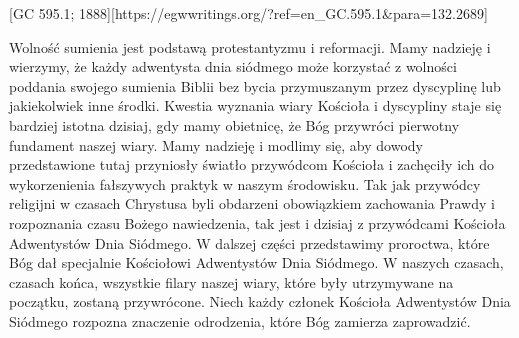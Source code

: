 [GC 595.1; 1888][https://egwwritings.org/?ref=en\_GC.595.1&para=132.2689]

Wolność sumienia jest podstawą protestantyzmu i reformacji. Mamy nadzieję i wierzymy, że każdy adwentysta dnia siódmego może korzystać z wolności poddania swojego sumienia Biblii bez bycia przymuszanym przez dyscyplinę lub jakiekolwiek inne środki. Kwestia wyznania wiary Kościoła i dyscypliny staje się bardziej istotna dzisiaj, gdy mamy obietnicę, że Bóg przywróci pierwotny fundament naszej wiary. Mamy nadzieję i modlimy się, aby dowody przedstawione tutaj przyniosły światło przywódcom Kościoła i zachęciły ich do wykorzenienia fałszywych praktyk w naszym środowisku. Tak jak przywódcy religijni w czasach Chrystusa byli obdarzeni obowiązkiem zachowania Prawdy i rozpoznania czasu Bożego nawiedzenia, tak jest i dzisiaj z przywódcami Kościoła Adwentystów Dnia Siódmego. W dalszej części przedstawimy proroctwa, które Bóg dał specjalnie Kościołowi Adwentystów Dnia Siódmego. W naszych czasach, czasach końca, wszystkie filary naszej wiary, które były utrzymywane na początku, zostaną przywrócone. Niech każdy członek Kościoła Adwentystów Dnia Siódmego rozpozna znaczenie odrodzenia, które Bóg zamierza zaprowadzić.

